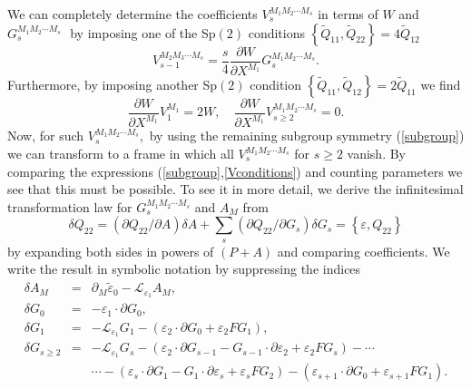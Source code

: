 \documentclass[a4paper,12pt]{article}
\begin{document}
We can completely determine the coefficients $V_{s}^{M_{1}M_{2}\cdots M_{s}}$
in terms of $W$ and $G_{s}^{M_{1}M_{2}\cdots M_{s}}\,$\ by imposing one of
the Sp$\left( 2\right) $ conditions $\left\{ \tilde{Q}_{11},\tilde{Q}%
_{22}\right\} =4\tilde{Q}_{12}$
\begin{equation}
V_{s-1}^{M_{2}M_{3}\cdots M_{s}}=\frac{s}{4}\frac{\partial W}{\partial
X^{M_{1}}}G_{s}^{M_{1}M_{2}\cdots M_{s}}.  \label{vsm1}
\end{equation}
Furthermore, by imposing another Sp$\left( 2\right) $ condition $\left\{
\tilde{Q}_{11},\tilde{Q}_{12}\right\} =2\tilde{Q}_{11}$ we find
\begin{equation}
\frac{\partial W}{\partial X^{M_{1}}}V_{1}^{M_{1}}=2W,\quad \frac{\partial W%
}{\partial X^{M_{1}}}V_{s\geq 2}^{M_{1}M_{2}\cdots M_{s}}=0.
\label{Vconditions}
\end{equation}
Now, for such $V_{s}^{M_{1}M_{2}\cdots M_{s}},$ by using the remaining
subgroup symmetry (\ref{subgroup}) we can transform to a frame in which all $%
V_{s}^{M_{1}M_{2}\cdots M_{s}}$ for $s\geq 2$ vanish. By comparing the
expressions (\ref{subgroup},\ref{Vconditions}) and counting parameters we
see that this must be possible. To see it in more detail, we derive the
infinitesimal transformation law for $G_{s}^{M_{1}M_{2}\cdots M_{s}}$ and $%
A_{M}$ from
\begin{equation}
\delta Q_{22}=\left( \partial Q_{22}/\partial A\right) \delta
A+\sum_{s}\left( \partial Q_{22}/\partial G_{s}\right) \delta G_{s}=\left\{
\varepsilon ,Q_{22}\right\}   \label{deltaQ22}
\end{equation}
by expanding both sides in powers of $\left( P+A\right) $ and comparing
coefficients. We write the result in symbolic notation by suppressing the
indices
\begin{eqnarray}
\delta A_{M} &=&\partial _{M}\tilde{\varepsilon}_{0}-\mathcal{L}%
_{\varepsilon _{1}}A_{M},\quad   \label{deltaG1} \\
\delta G_{0} &=&-\varepsilon _{1}\cdot \partial G_{0}, \\
\delta G_{1} &=&-\mathcal{L}_{\varepsilon _{1}}G_{1}-\left( \varepsilon
_{2}\cdot \partial G_{0}+\varepsilon _{2}FG_{1}\right) , \\
\delta G_{s\geq 2} &=&-\mathcal{L}_{\varepsilon _{1}}G_{s}-\left(
\varepsilon _{2}\cdot \partial G_{s-1}-G_{s-1}\cdot \partial \varepsilon
_{2}+\varepsilon _{2}FG_{s}\right) -\cdots   \nonumber \\
&&\cdots -\left( \varepsilon _{s}\cdot \partial G_{1}-G_{1}\cdot \partial
\varepsilon _{s}+\varepsilon _{s}FG_{2}\right) -\left( \varepsilon
_{s+1}\cdot \partial G_{0}+\varepsilon _{s+1}FG_{1}\right) .  \label{deltaGs}
\end{eqnarray}
\end{document}
